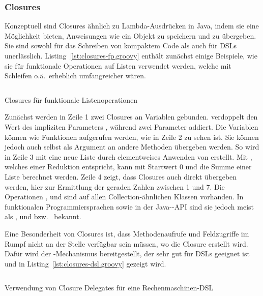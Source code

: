 \documentclass[a4paper]{article}
\newcommand{\codelisting}[3]{\begin{listing}[htp]
	\inputminted{#1}{#1/#2}
	\vspace{-3ex}
	\caption{#3}
	\label{lst:#2}
\end{listing}}
\begin{document}
\subsubsection{Closures}\label{subsubsec:closures}

Konzeptuell sind Closures ähnlich zu Lambda-Ausdrücken in Java, indem sie eine Möglichkeit bieten, Anweisungen wie ein Objekt zu speichern und zu übergeben.
Sie sind sowohl für das Schreiben von kompaktem Code als auch für DSLs unerlässlich.
Listing~\ref{lst:closures-fp.groovy} enthält zunächst einige Beispiele, wie sie für funktionale Operationen auf Listen verwendet werden, welche mit Schleifen o.ä.~erheblich umfangreicher wären.

\codelisting{groovy}{closures-fp.groovy}{Closures für funktionale Listenoperationen}

Zunächst werden in Zeile 1 zwei Closures an Variablen gebunden.
 verdoppelt den Wert des impliziten Parameters , während  zwei Parameter addiert.
Die Variablen können wie Funktionen aufgerufen werden, wie in Zeile 2 zu sehen ist.
Sie können jedoch auch selbst als Argument an andere Methoden übergeben werden.
So wird in Zeile 3 mit  eine neue Liste durch elementweises Anwenden von  erstellt.
Mit , welches einer Reduktion entspricht, kann mit Startwert 0 und  die Summe einer Liste berechnet werden.
Zeile 4 zeigt, dass Closures auch direkt übergeben werden, hier zur Ermittlung der geraden Zahlen zwischen 1 und 7.
Die Operationen ,  und  sind auf allen Collection-ähnlichen Klassen vorhanden.
In funktionalen Programmiersprachen sowie in der Java--API sind sie jedoch meist als ,  und  bzw.~ bekannt.

Eine Besonderheit von Closures ist, dass Methodenaufrufe und Feldzugriffe im Rumpf nicht an der Stelle verfügbar sein müssen, wo die Closure erstellt wird.
Dafür wird der -Mechanismus bereitgestellt, der sehr gut für DSLs geeignet ist und in Listing~\ref{lst:closures-dsl.groovy} gezeigt wird.

\codelisting{groovy}{closures-dsl.groovy}{Verwendung von Closure Delegates für eine Rechenmaschinen-DSL}
\end{document}
